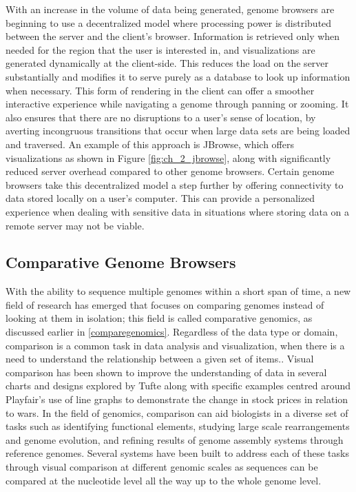 With an increase in the volume of data being generated, genome browsers are beginning to use a decentralized model where processing power is distributed between the server and the client's browser. Information is retrieved only when needed for the region that the user is interested in, and visualizations are generated dynamically at the client-side. This reduces the load on the server substantially and modifies it to serve purely as a database to look up information when necessary. This form of rendering in the client can offer a smoother interactive experience while navigating a genome through panning or zooming. It also ensures that there are no disruptions to a user's sense of location, by averting incongruous transitions that occur when large data sets are being loaded and traversed. An example of this approach is JBrowse, which offers visualizations as shown in Figure \ref{fig:ch_2_jbrowse}, along with significantly reduced server overhead compared to other genome browsers\cite{skinner2009jbrowse}.
Certain genome browsers take this decentralized model a step further by offering connectivity to data stored locally on a user's computer\cite{ucscgenome,saito2009utgb}. This can provide a personalized experience when dealing with sensitive data in situations where storing data on a remote server may not be viable. 

\subsection{Comparative Genome Browsers}
With the ability to sequence multiple genomes within a short span of time, a new field of research has emerged that focuses on comparing genomes instead of looking at them in isolation; this field is called comparative genomics, as discussed earlier in \ref{comparegenomics}. Regardless of the data type or domain, comparison is a common task in data analysis and visualization, when there is a need to understand the relationship between a given set of items.\cite{gleicher2017considerations}. Visual comparison has been shown to improve the understanding of data in several charts and designs explored by Tufte\cite{tufte1990envisioning} along with specific examples centred around Playfair's use of line graphs to demonstrate the change in stock prices in relation to wars\cite{costigan1990william}. In the field of genomics, comparison can aid biologists in a diverse set of tasks such as identifying functional elements, studying large scale rearrangements and genome evolution, and refining results of genome assembly systems through reference genomes\cite{nielsen2010visualizing}. Several systems have been built to address each of these tasks through visual comparison at different genomic scales as sequences can be compared at the nucleotide level all the way up to the whole genome level.

